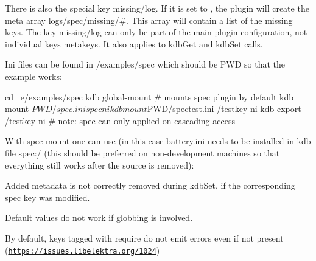There is also the special key {\ttfamily missing/log}. If it is set to {}, the plugin will create the meta array {\ttfamily logs/spec/missing/\#}. This array will contain a list of the missing keys. The key {\ttfamily missing/log} can only be part of the main plugin configuration, not individual keys\textquotesingle{} metakeys. It also applies to {\ttfamily kdb\+Get} and {\ttfamily kdb\+Set} calls.

Ini files can be found in /examples/spec which should be P\+WD so that the example works\+:


\begin{DoxyCode}
cd ~e/examples/spec
kdb global-mount        # mounts spec plugin by default
kdb mount $PWD/spec.ini spec ni
kdb mount $PWD/spectest.ini /testkey ni
kdb export /testkey ni     # note: spec can only applied on cascading access
\end{DoxyCode}


With spec mount one can use (in this case battery.\+ini needs to be installed in {\ttfamily kdb file spec\+:/} (this should be preferred on non-\/development machines so that everything still works after the source is removed)\+:





\begin{DoxyItemize}
\item Added metadata is not correctly removed during {\ttfamily kdb\+Set}, if the corresponding spec key was modified.
\item Default values do not work if globbing is involved.
\item By default, keys tagged with {\ttfamily require} do not emit errors even if not present (\href{https://issues.libelektra.org/1024}{\tt https\+://issues.\+libelektra.\+org/1024}) 
\end{DoxyItemize}